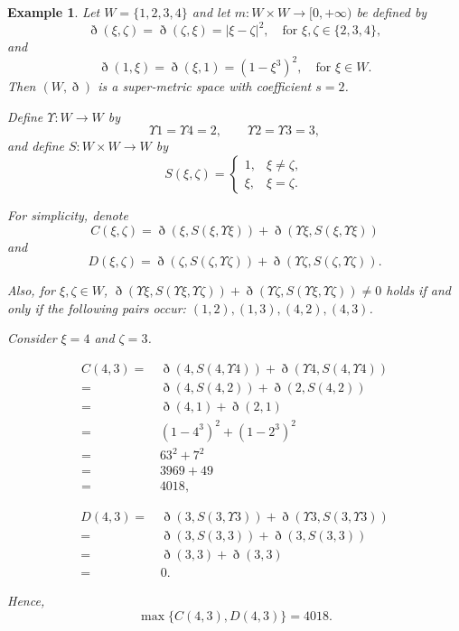 \documentclass[pdflatex,sn-mathphys-num]{sn-jnl}%
\theoremstyle{thmstyleone}%
\theoremstyle{thmstyletwo}%
\newtheorem{example}{Example}%
\theoremstyle{thmstylethree}%
\begin{document}
\begin{example}
Let $W=\{1,2,3,4\}$ and let $m:W\times W\to [0,+\infty)$ be defined by
\[
\eth(\xi ,\zeta)=\eth(\zeta,\xi)=|\xi-\zeta|^2,\quad \text{for } \xi,\zeta \in\{2,3,4\},
\]
and
\[
\eth(1,\xi)=\eth(\xi ,1)=(1-\xi^3)^2,\quad \text{for } \xi \in W.
\]
Then $(W,\eth)$ is a super-metric space with coefficient $s=2$.

Define $\Upsilon :W\to W$ by
\[
\Upsilon  1=\Upsilon  4=2,\qquad \Upsilon  2=\Upsilon  3=3,
\]
and define $S:W\times W\to W$ by
\[
S(\xi,\zeta)=
\begin{cases}
1, & \xi \ne \zeta,\\
\xi, & \xi =\zeta .
\end{cases}
\]

For simplicity, denote
\[
C(\xi ,\zeta)=\eth(\xi,S(\xi,\Upsilon \xi ))+\eth(\Upsilon \xi,S(\xi,\Upsilon \xi ))
\]
and
\[
D(\xi ,\zeta)=\eth(\zeta ,S(\zeta,\Upsilon \zeta))+\eth(\Upsilon \zeta,S(\zeta,\Upsilon \zeta)).
\]

Also, for $\xi,\zeta \in W$, $\eth(\Upsilon \xi,S(\Upsilon \xi,\Upsilon \zeta)) + \eth(\Upsilon \zeta,S(\Upsilon \xi,\Upsilon \zeta)) \neq 0$ holds if and only if the following pairs occur:
$(1,2),(1,3),(4,2),(4,3)$.

\medskip

Consider $\xi =4$ and $\zeta =3$.

\begin{align*}
C(4,3)=&\,\eth(4,S(4,\Upsilon  4))+\eth(\Upsilon 4,S(4,\Upsilon  4))\\
=&\,\eth(4,S(4,2))+\eth(2,S(4,2))\\
=&\,\eth(4,1)+\eth(2,1)\\
=&\,(1-4^3)^2+(1-2^3)^2\\
=&\,63^2+7^2\\
=&\,3969+49\\
=&\,4018,
\end{align*}

\begin{align*}
D(4,3)=&\,\eth(3,S(3,\Upsilon  3))+\eth(\Upsilon 3,S(3,\Upsilon  3))\\
=&\,\eth(3,S(3,3))+\eth(3,S(3,3))\\
=&\,\eth(3,3)+\eth(3,3)\\
=&\,0.
\end{align*}

Hence,
\[
\max\{C(4,3),D(4,3)\}=4018.
\]

\medskip


\end{example}
\end{document}
